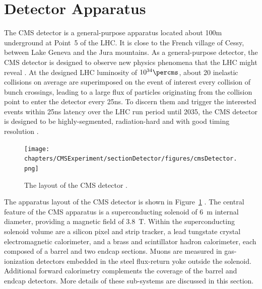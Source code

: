 

\section{Detector Apparatus}
\label{sec:cmsExperiment:detector}



The CMS \cite{exhep:cms:Chatrchyan:2008aa} detector is a general-purpose apparatus located about 100\unit{m} underground at Point~5 of the LHC. It is close to the French village of Cessy, between Lake Geneva and the Jura mountains. As a general-purpose detector, the CMS detector is designed to observe new physics phenomena that the LHC might reveal \cite{cms:tdr2:Ball:2007zza}. At the designed LHC luminosity of $10^{34}\percms$, about 20 inelastic collisions on average are superimposed on the event of interest every collision of bunch crossings, leading to a large flux of particles originating from the collision point to enter the detector every 25\unit{ns}. To discern them and trigger the interested events within 25\unit{ns} latency over the LHC run period until 2035, the CMS detector is designed to be highly-segmented, radiation-hard and with good timing resolution \cite{exhep:cms:Chatrchyan:2008aa}.

\begin{figure}[ht]
    \centering
    \texttt{[image: chapters/CMSExperiment/sectionDetector/figures/cmsDetector.png]}
    \caption{The layout of the CMS detector \cite{cms:detectorOverview}.}
    \label{fig:cmsExperiment:detector:detectorOverview}
\end{figure}

The apparatus layout of the CMS detector is shown in Figure~\ref{fig:cmsExperiment:detector:detectorOverview} \cite{cms:detectorOverview}. The central feature of the CMS apparatus is a superconducting solenoid of 6~m internal diameter, providing a magnetic field of 3.8~T. Within the superconducting solenoid volume are a silicon pixel and strip tracker, a lead tungstate crystal electromagnetic calorimeter, and a brass and scintillator hadron calorimeter, each composed of a barrel and two endcap sections. Muons are measured in gas-ionization detectors embedded in the steel flux-return yoke outside the solenoid. Additional forward calorimetry complements the coverage of the barrel and endcap detectors. More details of these sub-systems are discussed in this section. 



